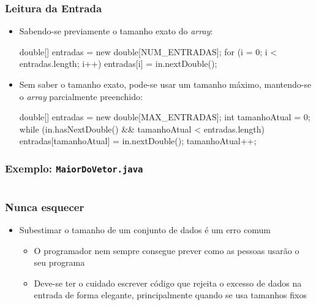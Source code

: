 \documentclass[xcolor={dvipsnames,table},aspectratio=169]{beamer}
\begin{document}
\begin{frame}[fragile]\frametitle{Leitura da Entrada}
\begin{itemize}
	\item Sabendo-se previamente o tamanho exato do \emph{array}:
{\small
\begin{javacode}
double[] entradas = new double[NUM_ENTRADAS];
for (i = 0; i < entradas.length; i++) {
   entradas[i] = in.nextDouble();
}
\end{javacode}
}
	\item Sem saber o tamanho exato, pode-se usar um tamanho máximo, mantendo-se o \emph{array} parcialmente preenchido:
{\small
\begin{javacode}
double[] entradas = new double[MAX_ENTRADAS];
int tamanhoAtual = 0;
while (in.hasNextDouble() && tamanhoAtual < entradas.length) {
   entradas[tamanhoAtual] = in.nextDouble();
   tamanhoAtual++;
}
\end{javacode}
}
\end{itemize}
\end{frame}

\begin{frame}[fragile]\frametitle{Exemplo: \texttt{MaiorDoVetor.java}}
\tiny{\inputminted[bgcolor=cyan!10]{java}{src/MaiorDoVetor.java}}
\end{frame}

\begin{frame}\frametitle{Nunca esquecer}
\begin{itemize}
	\item Subestimar o tamanho de um conjunto de dados é um erro comum
	\begin{itemize}
		\item O programador nem sempre consegue prever como as pessoas usarão o seu programa
		\item Deve-se ter o cuidado escrever código que rejeita o excesso de dados na entrada de forma elegante, principalmente quando se usa tamanhos fixos
	\end{itemize}
\end{itemize}
\end{frame}
\end{document}
